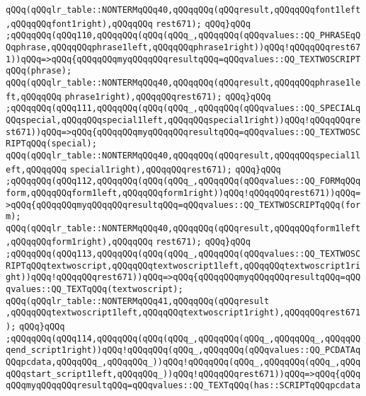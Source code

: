 \verb|qQQq(qQQqlr_table::NONTERMqQQq40,qQQqqQQq(qQQqresult,qQQqqQQqfont1left,qQQqqQQqfont1right),qQQqqQQq|\newline
\verb|rest671);|\newline
\verb|qQQq}qQQq|\newline
\verb|;qQQqqQQq(qQQq110,qQQqqQQq(qQQq(qQQq_,qQQqqQQq(qQQqvalues::QQ_PHRASEqQQqphrase,qQQqqQQqphrase1left,qQQqqQQqphrase1right))qQQq!qQQqqQQqrest671))qQQq=>qQQq{qQQqqQQqmyqQQqqQQqresultqQQq=qQQqvalues::QQ_TEXTWOSCRIPTqQQq(phrase);|\newline
\verb|qQQq(qQQqlr_table::NONTERMqQQq40,qQQqqQQq(qQQqresult,qQQqqQQqphrase1left,qQQqqQQq|\newline
\verb|phrase1right),qQQqqQQqrest671);|\newline
\verb|qQQq}qQQq|\newline
\verb|;qQQqqQQq(qQQq111,qQQqqQQq(qQQq(qQQq_,qQQqqQQq(qQQqvalues::QQ_SPECIALqQQqspecial,qQQqqQQqspecial1left,qQQqqQQqspecial1right))qQQq!qQQqqQQqrest671))qQQq=>qQQq{qQQqqQQqmyqQQqqQQqresultqQQq=qQQqvalues::QQ_TEXTWOSCRIPTqQQq(special);|\newline
\verb|qQQq(qQQqlr_table::NONTERMqQQq40,qQQqqQQq(qQQqresult,qQQqqQQqspecial1left,qQQqqQQq|\newline
\verb|special1right),qQQqqQQqrest671);|\newline
\verb|qQQq}qQQq|\newline
\verb|;qQQqqQQq(qQQq112,qQQqqQQq(qQQq(qQQq_,qQQqqQQq(qQQqvalues::QQ_FORMqQQqform,qQQqqQQqform1left,qQQqqQQqform1right))qQQq!qQQqqQQqrest671))qQQq=>qQQq{qQQqqQQqmyqQQqqQQqresultqQQq=qQQqvalues::QQ_TEXTWOSCRIPTqQQq(form);|\newline
\verb|qQQq(qQQqlr_table::NONTERMqQQq40,qQQqqQQq(qQQqresult,qQQqqQQqform1left,qQQqqQQqform1right),qQQqqQQq|\newline
\verb|rest671);|\newline
\verb|qQQq}qQQq|\newline
\verb|;qQQqqQQq(qQQq113,qQQqqQQq(qQQq(qQQq_,qQQqqQQq(qQQqvalues::QQ_TEXTWOSCRIPTqQQqtextwoscript,qQQqqQQqtextwoscript1left,qQQqqQQqtextwoscript1right))qQQq!qQQqqQQqrest671))qQQq=>qQQq{qQQqqQQqmyqQQqqQQqresultqQQq=qQQqvalues::QQ_TEXTqQQq(textwoscript);|\newline
\verb|qQQq(qQQqlr_table::NONTERMqQQq41,qQQqqQQq(qQQqresult|\newline
\verb|,qQQqqQQqtextwoscript1left,qQQqqQQqtextwoscript1right),qQQqqQQqrest671);|\newline
\verb|qQQq}qQQq|\newline
\verb|;qQQqqQQq(qQQq114,qQQqqQQq(qQQq(qQQq_,qQQqqQQq(qQQq_,qQQqqQQq_,qQQqqQQqend_script1right))qQQq!qQQqqQQq(qQQq_,qQQqqQQq(qQQqvalues::QQ_PCDATAqQQqpcdata,qQQqqQQq_,qQQqqQQq_))qQQq!qQQqqQQq(qQQq_,qQQqqQQq(qQQq_,qQQqqQQqstart_script1left,qQQqqQQq_))qQQq!qQQqqQQqrest671))qQQq=>qQQq{qQQqqQQqmyqQQqqQQqresultqQQq=qQQqvalues::QQ_TEXTqQQq(has::SCRIPTqQQqpcdata|\newline
